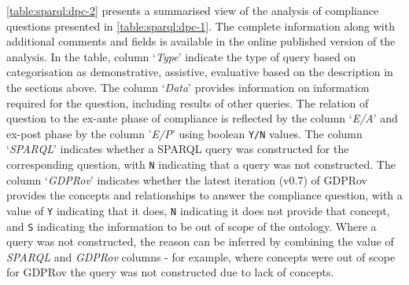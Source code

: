 \autoref{table:sparql:dpc-2} presents a summarised view of the analysis of compliance questions presented in \autoref{table:sparql:dpc-1}.
The complete information along with additional comments and fields is available in the online published version of the analysis.
In the table, column `\textit{Type}' indicate the type of query based on categorisation as demonstrative, assistive, evaluative based on the description in the sections above.
The column `\textit{Data}' provides information on information required for the question, including results of other queries.
The relation of question to the ex-ante phase of compliance is reflected by the column `\textit{E/A}' and ex-post phase by the column '\textit{E/P}' using boolean \texttt{Y/N} values.
The column `\textit{SPARQL}' indicates whether a SPARQL query was constructed for the corresponding question, with \texttt{N} indicating that a query was not constructed.
The column `\textit{GDPRov}' indicates whether the latest iteration (v0.7) of GDPRov provides the concepts and relationships to answer the compliance question, with a value of \texttt{Y} indicating that it does, \texttt{N} indicating it does not provide that concept, and \texttt{S} indicating the information to be out of scope of the ontology.
Where a query was not constructed, the reason can be inferred by combining the value of \textit{SPARQL} and \textit{GDPRov} columns - for example, where concepts were out of scope for GDPRov the query was not constructed due to lack of concepts. 
